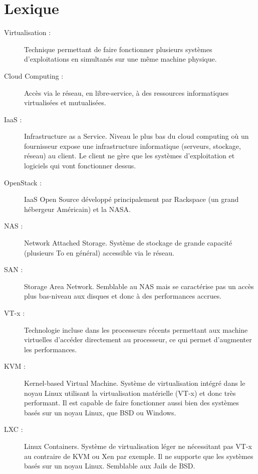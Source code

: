 \section{Lexique}
\begin{description}
\item[Virtualisation :] Technique permettant de faire fonctionner plusieurs systèmes d'exploitations en simultanés sur une même machine physique.

\item[Cloud Computing :] Accès via le réseau, en libre-service, à des ressources informatiques virtualisées et mutualisées.

\item[IaaS :] Infrastructure as a Service. Niveau le plus bas du cloud computing où un fournisseur expose une infrastructure informatique (serveurs, stockage, réseau) au client. Le client ne gère que les systèmes d'exploitation et logiciels qui vont fonctionner dessus.

\item[OpenStack :] IaaS Open Source développé principalement par Rackspace (un grand hébergeur Américain) et la NASA.

\item[NAS :] Network Attached Storage. Système de stockage de grande capacité (plusieurs To en général) accessible via le réseau.

\item[SAN :] Storage Area Network. Semblable au NAS mais se caractérise pas un accès plus bas-niveau aux disques et donc à des performances accrues.

\item[VT-x :] Technologie incluse dans les processeurs récents permettant aux machine virtuelles d'accéder directement au processeur, ce qui permet d'augmenter les performances.

\item[KVM :] Kernel-based Virtual Machine. Système de virtualisation intégré dans le noyau Linux utilisant la virtualisation matérielle (VT-x) et donc très performant. Il est capable de faire fonctionner aussi bien des systèmes basés sur un noyau Linux, que BSD ou Windows.

\item[LXC :] Linux Containers. Système de virtualisation léger ne nécessitant pas VT-x au contraire de KVM ou Xen par exemple. Il ne supporte que les systèmes basés sur un noyau Linux. Semblable aux Jails de BSD.
\end{description}
